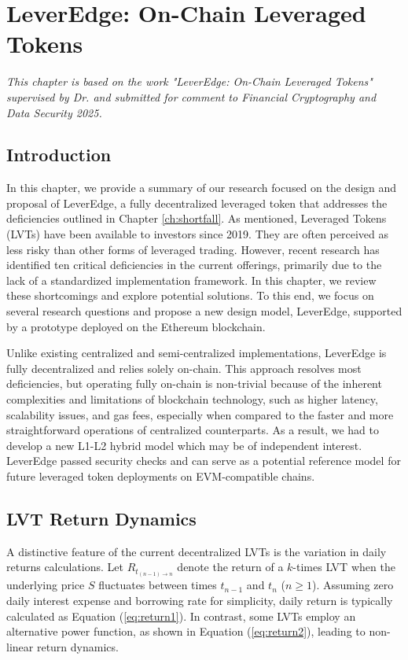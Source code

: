 
\chapter{LeverEdge: On-Chain Leveraged Tokens}\label{ch:leveredge}

\textit{This chapter is based on the work "LeverEdge: On-Chain Leveraged Tokens" supervised by Dr. \supv and submitted for comment to Financial Cryptography and Data Security 2025.}

\section{Introduction}
In this chapter, we provide a summary of our research focused on the design and proposal of LeverEdge, a fully decentralized leveraged token that addresses the deficiencies outlined in Chapter \ref{ch:shortfall}. As mentioned, Leveraged Tokens (LVTs) have been available to investors since 2019. They are often perceived as less risky than other forms of leveraged trading. However, recent research has identified ten critical deficiencies in the current offerings, primarily due to the lack of a standardized implementation framework. In this chapter, we review these shortcomings and explore potential solutions. To this end, we focus on several research questions and propose a new design model, LeverEdge, supported by a prototype deployed on the Ethereum blockchain. 

Unlike existing centralized and semi-centralized implementations, LeverEdge is fully decentralized and relies solely on-chain. This approach resolves most deficiencies, but operating fully on-chain is non-trivial because of the inherent complexities and limitations of blockchain technology, such as higher latency, scalability issues, and gas fees, especially when compared to the faster and more straightforward operations of centralized counterparts. As a result, we had to develop a new L1-L2 hybrid model which may be of independent interest. LeverEdge passed security checks and can serve as a potential reference model for future leveraged token deployments on EVM-compatible chains.

\section{LVT Return Dynamics}\label{appx:return}
A distinctive feature of the current decentralized LVTs is the variation in daily returns calculations. Let \( R_{t_{(n-1)\to n}} \) denote the return of a \(k\)-times LVT when the underlying price \( S \) fluctuates between times \( t_{n-1} \) and \( t_n \) (\(n \ge 1\)). Assuming zero daily interest expense and borrowing rate for simplicity, daily return is typically calculated as Equation (\ref{eq:return1}). In contrast, some LVTs employ an alternative power function, as shown in Equation (\ref{eq:return2}), leading to non-linear return dynamics.

